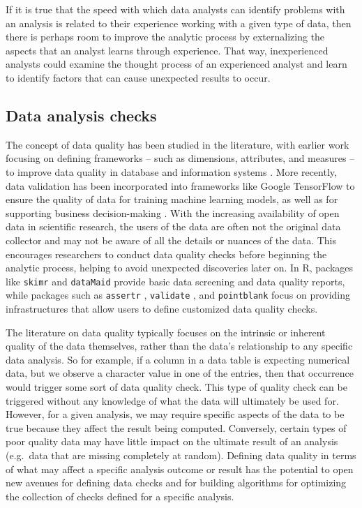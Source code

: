 \documentclass[
  12pt,
]{interact}
\begin{document}
If it is true that the speed with which data analysts can identify
problems with an analysis is related to their experience working with a
given type of data, then there is perhaps room to improve the analytic
process by externalizing the aspects that an analyst learns through
experience. That way, inexperienced analysts could examine the thought
process of an experienced analyst and learn to identify factors that can
cause unexpected results to occur.

\subsection{Data analysis checks}\label{data-analysis-checks}

The concept of data quality has been studied in the literature, with
earlier work focusing on defining frameworks -- such as dimensions,
attributes, and measures -- to improve data quality in database and
information systems
\citep{wang1996beyond, batini2009methodologies, 6204995, woodall2014classification, cai2015challenges, 8642813}.
More recently, data validation has been incorporated into frameworks
like Google TensorFlow \citep{polyzotis2019data} to ensure the quality
of data for training machine learning models, as well as for supporting
business decision-making \citep{schelter2018automating}. With the
increasing availability of open data in scientific research, the users
of the data are often not the original data collector and may not be
aware of all the details or nuances of the data. This encourages
researchers to conduct data quality checks before beginning the analytic
process, helping to avoid unexpected discoveries later on. In R,
packages like \texttt{skimr} \citep{skimr} and \texttt{dataMaid}
\citep{dataMaid} provide basic data screening and data quality reports,
while packages such as \texttt{assertr} \citep{assertr},
\texttt{validate} \citep{validate}, and \texttt{pointblank}
\citep{pointblank} focus on providing infrastructures that allow users
to define customized data quality checks.

The literature on data quality typically focuses on the intrinsic or
inherent quality of the data themselves, rather than the data's
relationship to any specific data analysis. So for example, if a column
in a data table is expecting numerical data, but we observe a character
value in one of the entries, then that occurrence would trigger some
sort of data quality check. This type of quality check can be triggered
without any knowledge of what the data will ultimately be used for.
However, for a given analysis, we may require specific aspects of the
data to be true because they affect the result being computed.
Conversely, certain types of poor quality data may have little impact on
the ultimate result of an analysis (e.g.~data that are missing
completely at random). Defining data quality in terms of what may affect
a specific analysis outcome or result has the potential to open new
avenues for defining data checks and for building algorithms for
optimizing the collection of checks defined for a specific analysis.
\end{document}
